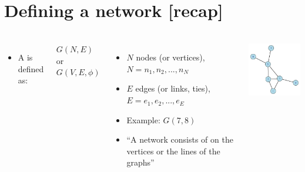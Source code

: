 \documentclass[8pt]{beamer}
\begin{document}





\section*{Defining a network [recap]}

\bgroup
{}
\begin{frame}[plain]{}
\begin{center}
\color{white}{\Huge\insertsection}
\end{center}
\end{frame}
\egroup


\begin{frame}
\frametitle{\insertsection}

\begin{columns}[c]
	\begin{itemize}
	\item A {\color{blue}{graph}} is defined as:
	\end{itemize}

    \centering
	$G(N, E)$
    or
    $G(V, E, \phi)$

	\begin{itemize}
		\item $N$ nodes (or vertices), $N = {n_1, n_2, ..., n_N}$
		\item $E$ edges (or links, ties), $E = {e_1, e_2, ..., e_E}$
		\item Example: $G(7,8)$
		\item ``A network consists of {\color{blue}{a graph and additional information}} on the vertices or the lines of the graphs'' \citep{deNooy2005}
		
	\end{itemize}

\centering
\includegraphics[width=5cm]{base}
\end{columns}

\end{frame}
\end{document}
